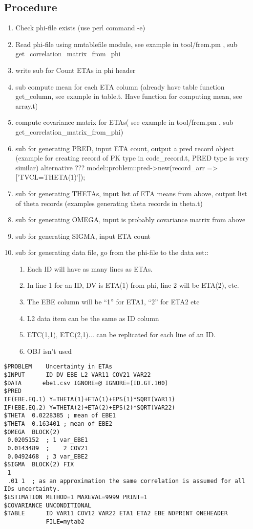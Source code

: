 \documentclass{article}
\begin{document}
\subsection*{Procedure}
\begin{enumerate}
\item Check phi-file exists (use perl command -e)
\item Read phi-file using nmtablefile module, see example in tool/frem.pm , sub get\_correlation\_matrix\_from\_phi
\item write sub for Count ETAs in phi header 
  \item sub compute mean for each ETA column (already have table function get\_column, see example in table.t. Have function for computing mean, see array.t)
  \item compute covariance matrix for ETAs( see example in tool/frem.pm , sub get\_correlation\_matrix\_from\_phi)
  \item sub for generating PRED, input ETA count, output a pred record object (example for creating record of PK type in code\_record.t, PRED type is very similar)
    alternative ??? model::problem::pred->new(record\_arr => ['TVCL=THETA(1)']);
  \item sub for generating THETAs, input list of ETA means from above, output list of theta records (examples generating theta records in theta.t)
  \item sub for generating OMEGA, input is probably covariance matrix from above
  \item sub for generating SIGMA, input ETA count
  \item sub for generating data file, go from the phi-file to the data set::
    \begin{enumerate}
      \item Each ID will have as many lines as ETAs.
       \item In line 1 for an ID, DV is ETA(1) from phi, line 2 will be ETA(2), etc.
         \item  The EBE column will be “1” for ETA1, “2” for ETA2 etc
           \item L2 data item can be the same as ID column
            \item      ETC(1,1),  ETC(2,1)... can be replicated for each line of an ID.
              \item    OBJ isn’t used
      \end{enumerate}
\end{enumerate}
\newpage
\begin{verbatim}
$PROBLEM    Uncertainty in ETAs
$INPUT      ID DV EBE L2 VAR11 COV21 VAR22
$DATA      ebe1.csv IGNORE=@ IGNORE=(ID.GT.100)
$PRED  
IF(EBE.EQ.1) Y=THETA(1)+ETA(1)+EPS(1)*SQRT(VAR11)
IF(EBE.EQ.2) Y=THETA(2)+ETA(2)+EPS(2)*SQRT(VAR22)
$THETA  0.0228385 ; mean of EBE1
$THETA  0.163401 ; mean of EBE2
$OMEGA  BLOCK(2)
 0.0205152  ; 1 var_EBE1
 0.0143489  ;    2 COV21
 0.0492468  ; 3 var_EBE2
$SIGMA  BLOCK(2) FIX
 1
 .01 1  ; as an approximation the same correlation is assumed for all IDs uncertainty.
$ESTIMATION METHOD=1 MAXEVAL=9999 PRINT=1
$COVARIANCE UNCONDITIONAL
$TABLE      ID VAR11 COV12 VAR22 ETA1 ETA2 EBE NOPRINT ONEHEADER
            FILE=mytab2
\end{verbatim}
\end{document}
